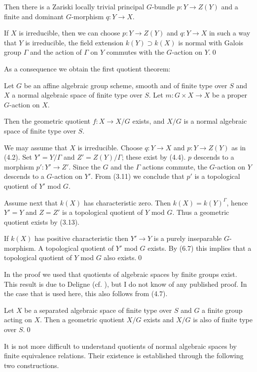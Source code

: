 Then there is a Zariski locally trivial principal $G$-bundle $p:Y\to Z(Y)$
and a finite and dominant $G$-morphism $q:Y\to X$.

If $X$ is irreducible, then we can choose $p:Y\to Z(Y)$ and $q:Y\to X$ in such
a way that $Y$ is irreducible, the field extension $k(Y)\supset k(X)$ is normal
with Galois group
$\Gamma$ and the action of $\Gamma$  on $Y$ commutes with the $G$-action on
$Y$.\qed
\endproclaim


As a consequence we obtain the first quotient theorem:

 Let  $G$ be an  affine
algebraic group scheme, smooth and    of finite type over $S$ and $X$ a normal
 algebraic space  of finite type  over $S$. Let $m:G\times X\to X$
be a proper
$G$-action on $X$.

Then the geometric quotient $f:X\to X/G$ exists, and $X/G$ is a  normal
algebraic space    of finite type over $S$.
\endproclaim



\demop  We may assume that $X$ is irreducible. Choose $q:Y\to X$ and $p:Y\to
Z(Y)$ as in (4.2).  Set $Y'=Y/\Gamma$ and $Z'=Z(Y)/\Gamma$; these exist by
(4.4). $p$ descends to a morphism $p':Y'\to Z'$.  Since the $G$ and the
$\Gamma$ actions commute, the $G$-action on $Y$ descends to a $G$-action on
$Y'$.
{}From (3.11) we conclude that
$p'$ is a topological quotient of $Y'$ mod $G$.

Assume next that $k(X)$ has characteristic zero. Then $k(X)=k(Y)^{\Gamma}$,
hence  $Y'=Y$ and  $Z=Z'$ is a topological quotient of $Y$ mod $G$.
Thus a geometric quotient exists by (3.13).

If $k(X)$ has positive characteristic   then $Y'\to Y$ is a purely inseparable
$G$-morphism. A topological quotient of $Y'$ mod $G$ exists. By (6.7) this
implies that  a topological quotient of $Y$ mod $G$ also exists.\qed\enddemo

In the proof we used  that quotients of algebraic spaces by finite groups
exist. This result is due to Deligne (cf. \cite{Knutson71, p.185}), but I do
not know of any published proof. In the case that is used here,  this also
follows from (4.7).

  Let $X$ be a  separated algebraic space
of finite type over $S$ and $G$ a finite
group acting on $X$. Then a geometric quotient $X/G$ exists and $X/G$ is also
of finite type over $S$.\qed
\endproclaim

It is not  more difficult  to understand quotients of normal algebraic spaces
by finite equivalence relations. Their existence is established through the
following two constructions.

